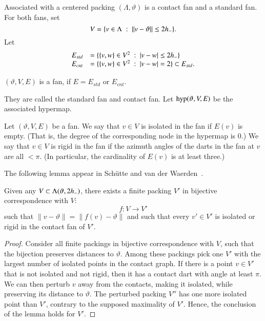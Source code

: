 Associated with a centered packing $(\Lambda,\vartheta)$ is a contact fan and a standard fan.  For both fans, set
$$
V = \{v\in \Lambda\ :\  \|v-\vartheta\|\le 2{h_-}\}.
$$
Let
\begin{equation}\label{eqn:fan-edge}
\begin{array}{lll}
 E_{std} &= \{\{v,w\}\in V^2\ :\  |v-w|\le 2{h_-} \}\\
 E_{cnt} &= \{\{v,w\}\in V^2\ :\  |v-w|= 2 \}\subset E_{std}.
\end{array}
\end{equation}

\begin{lemma}
$(\vartheta,V,E)$ is a fan, if $E=E_{std}$ or $E_{cnt}$.
\end{lemma}
They are called the standard fan and contact fan.
Let ${\operatorname{hyp}}(\vartheta,V,E)$ be the associated hypermap.

\begin{definition}
Let $(\vartheta,V,E)$ be a fan.
We say that $v\in V$ is isolated in the fan if $E(v)$ is empty.
(That is, the degree of the corresponding node in the hypermap is $0$.) We say that $v\in V$ is rigid in the fan if the azimuth angles of the darts in the fan at $v$ are all $<\pi$.  (In particular, the cardinality of $E(v)$ is at least three.)
\end{definition}

The following lemma appear in Sch\"utte and van der Waerden~\cite{vanderWaerden:1951}.

\begin{lemma}
Given any $V\subset \Lambda(\vartheta,2{h_-})$,
there exists a finite packing $V'$ 
in bijective correspondence with $V$:
$$
f:V\to V'
$$
such that $\|v-\vartheta\| = \|f(v)-\vartheta\|$ and
such that every $v'\in V'$
is isolated or rigid in the contact fan of $V'$.
\end{lemma}

\begin{proof} Consider all finite packings in 
bijective correspondence with $V$, such that the
bijection preserves distances to $\vartheta$.
Among these packings pick one $V'$ with the largest number
of isolated points in the contact graph.  If there is a point $v\in V'$ that
is not isolated and not rigid, then it has a contact
dart with angle at least $\pi$.  We can then perturb $v$ away from the contacts, making it isolated, while preserving its distance to $\vartheta$.  The perturbed packing $V''$ has one more isolated point than $V'$, contrary to the supposed maximality of $V'$.  Hence, the conclusion of the 
lemma holds for $V'$.
\end{proof}

